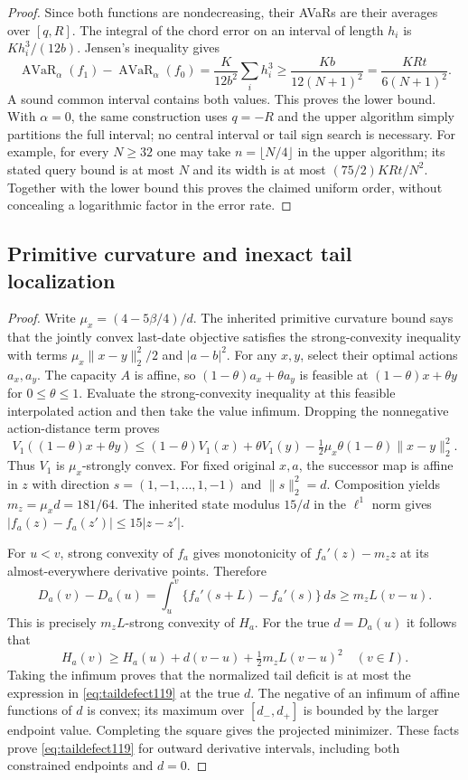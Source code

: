 \begin{proof}
Since both functions are nondecreasing, their AVaRs are their averages
over $[q,R]$.  The integral of the chord error on an interval of
length $h_i$ is $K h_i^3/(12b)$.  Jensen's inequality gives
\[
 \operatorname{AVaR}_\alpha(f_1)-\operatorname{AVaR}_\alpha(f_0)
 =\frac{K}{12b^2}\sum_i h_i^3
 \ge\frac{Kb}{12(N+1)^2}
 =\frac{KRt}{6(N+1)^2}.
\]
A sound common interval contains both values.  This proves the lower
bound.  With $\alpha=0$, the same construction uses $q=-R$ and
the upper algorithm simply partitions the full interval; no central
interval or tail sign search is necessary.  For example, for every
$N\ge32$ one may take $n=\lfloor N/4\rfloor$ in the upper
algorithm; its stated query bound is at most $N$ and its width is at
most $(75/2)KRt/N^2$.  Together with the lower bound this proves the
claimed uniform order, without concealing a logarithmic factor in the
error rate.
\end{proof}

\subsection{Primitive curvature and inexact tail localization}
\begin{proof}
Write $\mu_x=(4-5\beta/4)/d$.  The inherited primitive curvature
bound says that the jointly convex last-date objective satisfies the
strong-convexity inequality with terms
$\mu_x\|x-y\|_2^2/2$ and $|a-b|^2$.
For any $x,y$, select their optimal actions $a_x,a_y$.
The capacity $A$ is affine, so
$(1-\theta)a_x+\theta a_y$ is feasible at
$(1-\theta)x+\theta y$ for $0\le\theta\le1$.
Evaluate the strong-convexity inequality at this feasible interpolated
action and then take the value infimum.  Dropping the nonnegative
action-distance term proves
\[
 V_1((1-\theta)x+\theta y)
 \le(1-\theta)V_1(x)+\theta V_1(y)
       -\tfrac12\mu_x\theta(1-\theta)\|x-y\|_2^2.
\]
Thus $V_1$ is $\mu_x$-strongly convex.  For fixed original $x,a$,
the successor map is affine in $z$ with direction
$s=(1,-1,\ldots,1,-1)$ and $\|s\|_2^2=d$.
Composition yields $m_z=\mu_xd=181/64$.  The inherited state
modulus $15/d$ in the $\ell^1$ norm gives
$|f_a(z)-f_a(z')|\le15|z-z'|$.

For $u<v$, strong convexity of $f_a$ gives monotonicity of
$f_a'(z)-m_zz$ at its almost-everywhere derivative points.  Therefore
\[
 D_a(v)-D_a(u)
 =\int_u^v\{f_a'(s+L)-f_a'(s)\}\,ds
 \ge m_zL(v-u).
\]
This is precisely $m_zL$-strong convexity of $H_a$.  For the true
$d=D_a(u)$ it follows that
\[
 H_a(v)\ge H_a(u)+d(v-u)+\tfrac12m_zL(v-u)^2
 \quad(v\in I).
\]
Taking the infimum proves that the normalized tail deficit is at most
the expression in \eqref{eq:taildefect119} at the true $d$.
The negative of an infimum of affine functions of $d$ is convex;
its maximum over $[d_-,d_+]$ is bounded by the larger endpoint
value.  Completing the square gives the projected minimizer.  These
facts prove \eqref{eq:taildefect119} for outward derivative intervals,
including both constrained endpoints and $d=0$.
\end{proof}

